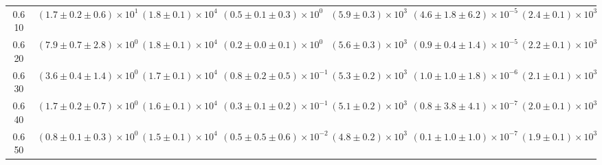 \begin{center}
\begin{landscape}
\begin{table}[h!]
\begin{tabular}{ccccccc}
0.610 & $\left(1.7 \pm 0.2 \pm 0.6 \right) \times 10^{1}$ & $\left(1.8 \pm 0.1\right) \times 10^{4}$ & $\left(0.5 \pm 0.1 \pm 0.3 \right) \times 10^{0}$ & $\left(5.9 \pm 0.3\right) \times 10^{3}$ & $\left(4.6 \pm 1.8 \pm 6.2 \right) \times 10^{-5}$ & $\left(2.4 \pm 0.1\right) \times 10^{3}$ \\
0.620 & $\left(7.9 \pm 0.7 \pm 2.8 \right) \times 10^{0}$ & $\left(1.8 \pm 0.1\right) \times 10^{4}$ & $\left(0.2 \pm 0.0 \pm 0.1 \right) \times 10^{0}$ & $\left(5.6 \pm 0.3\right) \times 10^{3}$ & $\left(0.9 \pm 0.4 \pm 1.4 \right) \times 10^{-5}$ & $\left(2.2 \pm 0.1\right) \times 10^{3}$ \\
0.630 & $\left(3.6 \pm 0.4 \pm 1.4 \right) \times 10^{0}$ & $\left(1.7 \pm 0.1\right) \times 10^{4}$ & $\left(0.8 \pm 0.2 \pm 0.5 \right) \times 10^{-1}$ & $\left(5.3 \pm 0.2\right) \times 10^{3}$ & $\left(1.0 \pm 1.0 \pm 1.8 \right) \times 10^{-6}$ & $\left(2.1 \pm 0.1\right) \times 10^{3}$ \\
0.640 & $\left(1.7 \pm 0.2 \pm 0.7 \right) \times 10^{0}$ & $\left(1.6 \pm 0.1\right) \times 10^{4}$ & $\left(0.3 \pm 0.1 \pm 0.2 \right) \times 10^{-1}$ & $\left(5.1 \pm 0.2\right) \times 10^{3}$ & $\left(0.8 \pm 3.8 \pm 4.1 \right) \times 10^{-7}$ & $\left(2.0 \pm 0.1\right) \times 10^{3}$ \\
0.650 & $\left(0.8 \pm 0.1 \pm 0.3 \right) \times 10^{0}$ & $\left(1.5 \pm 0.1\right) \times 10^{4}$ & $\left(0.5 \pm 0.5 \pm 0.6 \right) \times 10^{-2}$ & $\left(4.8 \pm 0.2\right) \times 10^{3}$ & $\left(0.1 \pm 1.0 \pm 1.0 \right) \times 10^{-7}$ & $\left(1.9 \pm 0.1\right) \times 10^{3}$ \\
\hline
\end{tabular}
\end{table}


\end{landscape}
\end{center}
